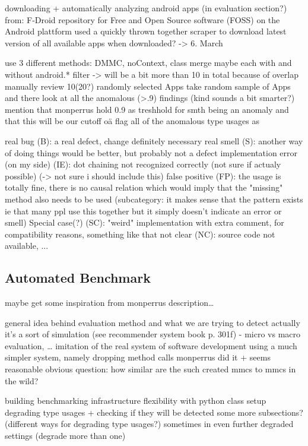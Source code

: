 downloading + automatically analyzing android apps (in evaluation section?)
from: F-Droid
repository for Free and Open Source software (FOSS) on the Android plattform
used a quickly thrown together scraper to download latest version of all available apps
when downloaded? -> 6. March

use 3 different methods: DMMC, noContext, class merge
maybe each with and without android.* filter -> will be a bit more than 10 in total because of overlap
manually review 10(20?) randomly selected Apps
take random sample of Apps and there look at all the anomalous (>.9) findings (kind sounds a bit smarter?)
mention that monperrus hold 0.9 as treshhold for smth being an anomaly and that this will be our cutoff oä
flag all of the anomalous type usages as

real bug (B): a real defect, change definitely necessary
real smell (S): another way of doing things would be better, but probably not a defect
implementation error (on my side) (IE): dot chaining not recognized correctly (not sure if actualy possible) (-> not sure i should include this)
false positive (FP): the usage is totally fine, there is no causal relation which would imply that the "missing" method also needs to be used
	(subcategory: it makes sense that the pattern exists ie that many ppl use this together but it simply doesn't indicate an error or smell)
Special case(?) (SC): "weird" implementation with extra comment, for compatibility reasons, something like that
not clear (NC): source code not available, ...

\subsection{Automated Benchmark}

maybe get some inspiration from monperrus description\ldots

general idea behind evaluation method and what we are trying to detect
actually it's a sort of simulation (see recommender system book p. 301f) - micro vs macro evaluation, \ldots
    imitation of the real system of software development
    using a much simpler system, namely dropping method calls
monperrus did it + seems reasonable
    obvious question: how similar are the such created mmcs to mmcs in the wild?

building benchmarking infrastructure
flexibility with python class setup
degrading type usages + checking if they will be detected
    some more subsections? (different ways for degrading type usages?)
    sometimes in even further degraded settings (degrade more than one)

